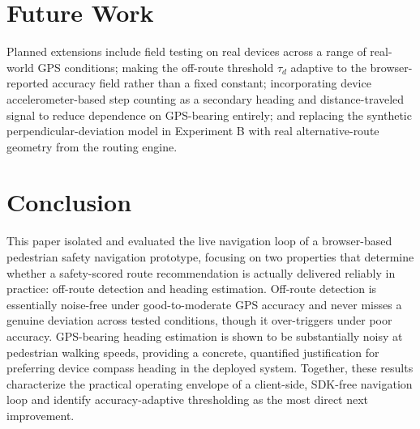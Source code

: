 \documentclass[conference]{IEEEtran}
\begin{document}
\section{Future Work}

Planned extensions include field testing on real devices across a range of real-world GPS conditions; making the off-route threshold $\tau_d$ adaptive to the browser-reported accuracy field rather than a fixed constant; incorporating device accelerometer-based step counting as a secondary heading and distance-traveled signal to reduce dependence on GPS-bearing entirely; and replacing the synthetic perpendicular-deviation model in Experiment B with real alternative-route geometry from the routing engine.

\section{Conclusion}

This paper isolated and evaluated the live navigation loop of a browser-based pedestrian safety navigation prototype, focusing on two properties that determine whether a safety-scored route recommendation is actually delivered reliably in practice: off-route detection and heading estimation. Off-route detection is essentially noise-free under good-to-moderate GPS accuracy and never misses a genuine deviation across tested conditions, though it over-triggers under poor accuracy. GPS-bearing heading estimation is shown to be substantially noisy at pedestrian walking speeds, providing a concrete, quantified justification for preferring device compass heading in the deployed system. Together, these results characterize the practical operating envelope of a client-side, SDK-free navigation loop and identify accuracy-adaptive thresholding as the most direct next improvement.
\end{document}
